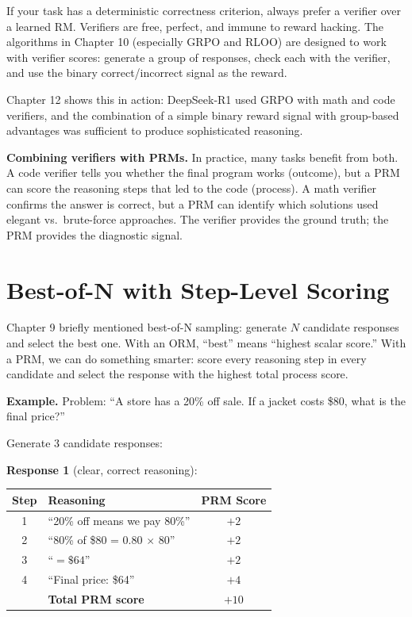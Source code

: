 \begin{chapterenv}
\begin{tipbox}
If your task has a deterministic correctness criterion, always prefer a verifier over a learned RM. Verifiers are free, perfect, and immune to reward hacking. The algorithms in Chapter 10 (especially GRPO and RLOO) are designed to work with verifier scores: generate a group of responses, check each with the verifier, and use the binary correct/incorrect signal as the reward.

Chapter 12 shows this in action: DeepSeek-R1 used GRPO with math and code verifiers, and the combination of a simple binary reward signal with group-based advantages was sufficient to produce sophisticated reasoning.
\end{tipbox}

\textbf{Combining verifiers with PRMs.} In practice, many tasks benefit from both. A code verifier tells you whether the final program works (outcome), but a PRM can score the reasoning steps that led to the code (process). A math verifier confirms the answer is correct, but a PRM can identify which solutions used elegant vs.\ brute-force approaches. The verifier provides the ground truth; the PRM provides the diagnostic signal.

\section{Best-of-N with Step-Level Scoring}

Chapter 9 briefly mentioned best-of-N sampling: generate $N$ candidate responses and select the best one. With an ORM, ``best'' means ``highest scalar score.'' With a PRM, we can do something smarter: score every reasoning step in every candidate and select the response with the highest total process score.

\textbf{Example.} Problem: ``A store has a 20\% off sale. If a jacket costs \$80, what is the final price?''

Generate 3 candidate responses:

\textbf{Response 1} (clear, correct reasoning):

\begin{center}
\begin{tabular}{clc}
\toprule
\textbf{Step} & \textbf{Reasoning} & \textbf{PRM Score} \\
\midrule
1 & ``20\% off means we pay 80\%'' & $+2$ \\
2 & ``80\% of \$80 = 0.80 $\times$ 80'' & $+2$ \\
3 & ``$= \$64$'' & $+2$ \\
4 & ``Final price: \$64'' & $+4$ \\
\midrule
& \textbf{Total PRM score} & $+10$ \\
\bottomrule
\end{tabular}
\end{center}


\end{chapterenv}
